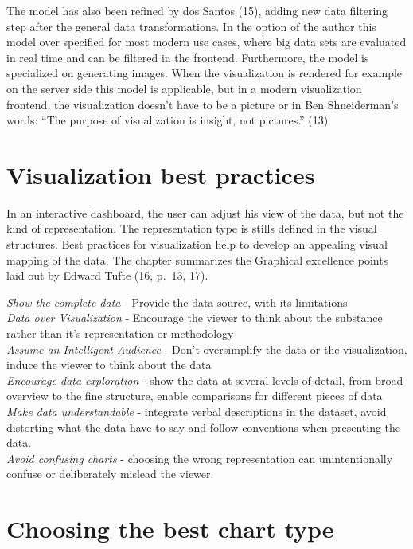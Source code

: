 \documentclass[american,a4paper,oneside,,tablecaptionabove]{scrbook}
\begin{document}
The model has also been refined by dos Santos (15), adding new data
filtering step after the general data transformations. In the option of
the author this model over specified for most modern use cases, where
big data sets are evaluated in real time and can be filtered in the
frontend. Furthermore, the model is specialized on generating images.
When the visualization is rendered for example on the server side this
model is applicable, but in a modern visualization frontend, the
visualization doesn't have to be a picture or in Ben Shneiderman's
words: \enquote{The purpose of visualization is insight, not pictures.}
(13)

\section{Visualization best
practices}\label{visualization-best-practices}

In an interactive dashboard, the user can adjust his view of the data,
but not the kind of representation. The representation type is stills
defined in the visual structures. Best practices for visualization help
to develop an appealing visual mapping of the data. The chapter
summarizes the Graphical excellence points laid out by Edward Tufte (16,
p.~13, 17).

\emph{Show the complete data} - Provide the data source, with its
limitations\\
\emph{Data over Visualization} - Encourage the viewer to think about the
substance rather than it's representation or methodology\\
\emph{Assume an Intelligent Audience} - Don't oversimplify the data or
the visualization, induce the viewer to think about the data\\
\emph{Encourage data exploration} - show the data at several levels of
detail, from broad overview to the fine structure, enable comparisons
for different pieces of data\\
\emph{Make data understandable} - integrate verbal descriptions in the
dataset, avoid distorting what the data have to say and follow
conventions when presenting the data.\\
\emph{Avoid confusing charts} - choosing the wrong representation can
unintentionally confuse or deliberately mislead the viewer.

\section{Choosing the best chart
type}\label{choosing-the-best-chart-type}
\end{document}
